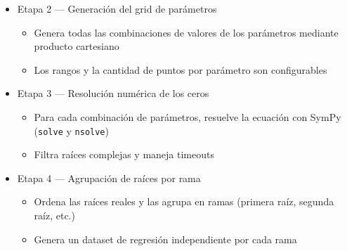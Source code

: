 \documentclass[12pt, a4paper]{article}
\begin{document}
\begin{itemize}[leftmargin=1.5em]
  \item Etapa 2 --- Generación del grid de parámetros
  \begin{itemize}
\item Genera todas las combinaciones de valores de los parámetros mediante producto cartesiano \item Los rangos y la cantidad de puntos por parámetro son configurables
  \end{itemize}

  \item Etapa 3 --- Resolución numérica de los ceros
  \begin{itemize}
\item Para cada combinación de parámetros, resuelve la ecuación con SymPy (\texttt{solve} y \texttt{nsolve}) \item Filtra raíces complejas y maneja timeouts
  \end{itemize}

  \item Etapa 4 --- Agrupación de raíces por rama
  \begin{itemize}
\item Ordena las raíces reales y las agrupa en ramas (primera raíz, segunda raíz, etc.) \item Genera un dataset de regresión independiente por cada rama
  \end{itemize}


\end{itemize}
\end{document}
